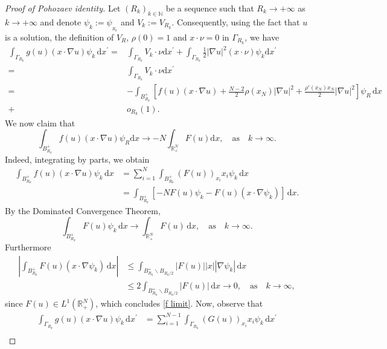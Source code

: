 \documentclass[12pt,reqno]{amsart}
\begin{document}
\begin{proof}[Proof of Pohozaev identity]
        Let $(R_k)_{k\in\mathds{N}}$  be a sequence such that $R_k\longrightarrow+\infty$ as $k\longrightarrow+\infty$ and denote $\psi_k:=\psi_{_{R_k}}$ and $V_{k}:=V_{R_k}$. Consequently, using the fact that $u$ is a solution,  the definition of $V_R$, $\rho(0)=1$ and $x\cdot \nu=0$ in $\Gamma_{R_k}$, we have
		\begin{align}\label{limite}
			\int_{\Gamma_{R_k}}g(u)(x\cdot\nabla u) \psi_k\,\mathrm{d}x^\prime=&\int_{\Gamma_{R_k}}V_{k} \cdot \nu \mathrm{d}x^\prime +\int_{\Gamma_{R_k}} \frac{1}{2}|\nabla u|^2(x\cdot \nu)\psi_k \mathrm{d}x^\prime \nonumber\\
            =& \int_{\Gamma_{R_k}}V_{k} \cdot \nu \mathrm{d}x^\prime\nonumber\\
            =&-\int_{ B_{R_k}^+}\left[f(u)(x\cdot\nabla u)+\frac{N-2}{2}\rho(x_N)|\nabla u|^2+\frac{\rho'(x_N)x_N}{2}|\nabla u|^2\right]\psi_{R}\,\mathrm{d}x\nonumber\\
            +& o_{R_k}(1).
		\end{align}
		We now claim that
        \begin{equation}\label{f limit}
            \int_{B_{R_k}^+}f(u)(x\cdot \nabla u)\psi_R\mathrm{d}x\longrightarrow -N\int_{\mathds{R}^N_+}F(u)\mathrm{d}x,\quad \text{as}\quad k\longrightarrow\infty.
        \end{equation}
        Indeed, integrating by parts, we obtain
		\begin{align*}
			\int_{B_{R_k}^+}f(u)(x\cdot\nabla u)\psi_k\,\mathrm{d}x	&=\sum_{i=1}^N\int_{B_{R_k}^+}\left(F(u)\right)_{x_i}x_i\psi_k\,\mathrm{d}x\\
			&=\int_{B_{R_k}^+}\left[-NF(u)\psi_k-F(u)(x\cdot\nabla\psi_k)\right]\,\mathrm{d}x.
		\end{align*}
		By the Dominated Convergence Theorem,
		$$
\int_{B_{R_k}^+}F(u)\psi_k\,\mathrm{d}x\longrightarrow\int_{\mathds{R}^N_+}F(u)\,\mathrm{d}x, \quad \text{as}\quad k\longrightarrow\infty.
		$$
Furthermore
		\begin{align*}
		\left|\int_{B_{R_k}^+}F(u)(x\cdot\nabla\psi_k)\,\mathrm{d}x\right|&\leq \int_{B_{R_k}^+\backslash B_{R_k/2}}|F(u)||x||\nabla\psi_k|\,\mathrm{d}x\\&\leq 2\int_{B_{R_k}^+\backslash B_{R_k/2}}|F(u)|\,\mathrm{d}x\longrightarrow0,\quad \text{as}\quad k\longrightarrow\infty,   
		\end{align*}
since $F(u)\in L^1(\mathds{R}^N_+)$, which concludes \eqref{f limit}. Now, observe that 
		$$
		\begin{aligned}
		\int_{\Gamma_{R_k}}g(u)(x\cdot\nabla u) \psi_k\,\mathrm{d}x^\prime&=\sum_{i=1}^{N-1}\int_{\Gamma_{R_k}}\left(G(u)\right)_{x_i}x_i\psi_k\,\mathrm{d}x^\prime\\

\end{aligned}$$
\end{proof}
\end{document}
